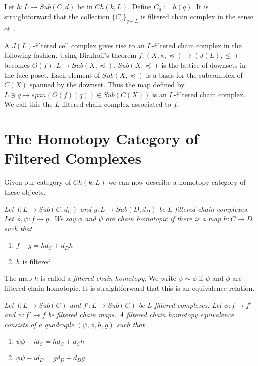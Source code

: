 \begin{rem}
Let $h:L\to Sub(C,d)$ be in $Ch(k,L)$.  Define $C_q := h(q)$. It is straightforward that the collection $\{C_q\}_{q\in L}$ is filtered chain complex in the sense of~\cite[Section 7]{salamon}.
\end{rem}


A $J(L)$-filtered cell complex gives rise to an $L$-filtered chain complex in the following fashion.   Using Birkhoff's theorem $f:(X,\kappa,\preceq)\to (J(L),\leq)$ becomes $O(f):L\to Sub(X,\preceq)$.  $Sub(X,\preceq)$ is the lattice of downsets in the face poset.  Each element of $Sub(X,\preceq)$ is a basis for the subcomplex of $C(X)$ spanned by the downset.   Thus the map defined by $L\ni q\mapsto span(O(f)(q))\in Sub(C(X))$ is an $L$-filtered chain complex.  We call this the $L$-filtered chain complex associated to $f$.




\section{The Homotopy Category of Filtered Complexes}\label{sec:homotopy}

Given our category of $Ch(k,L)$ we can now describe a homotopy category of these objects.

\begin{defn}
{\em
Let $f:L\to Sub(C,d_C)$ and $g:L\to Sub(D,d_D)$ be $L$-filtered chain complexes.  Let $\phi,\psi:f\to g$.  We say $\phi$ and $\psi$ are {\em chain homotopic} if there is a map $h:C\to D$ such that
\begin{enumerate}
\item $f-g = hd_C+d_Dh$
\item $h$ is filtered
\end{enumerate}  
}
\end{defn}

The map $h$ is called a {\em filtered chain homotopy}.  We write $\psi\sim \phi$ if $\psi$ and $\phi$ are filtered chain homotopic.  It is straightforward that this is an equivalence relation.  

\begin{defn}
{\em
Let $f:L\to Sub(C)$ and $f':L\to Sub(C)$ be $L$-filtered complexes.  Let $\phi:f\to f'$ and $\psi:f'\to f$ be filtered chain maps.  A {\em filtered chain homotopy equivalence} consists of a quadruple $(\psi,\phi,h,g)$ such that 
\begin{enumerate}
\item $\psi\phi-id_C= hd_C + d_Ch$
\item $\phi\psi-id_D = gd_D+d_Dg$
\end{enumerate}
}
\end{defn}


